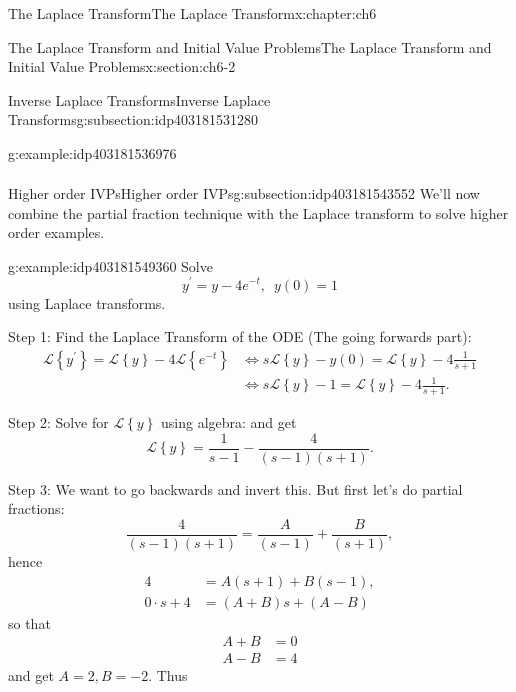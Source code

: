 \documentclass[oneside,10pt,]{book}
\numberwithin{equation}{section}
\numberwithin{equation}{section}
\newcommand{\amp}{&}
\begin{document}
\begin{chapterptx}{The Laplace Transform}{}{The Laplace Transform}{}{}{x:chapter:ch6}
\begin{sectionptx}{The Laplace Transform and Initial Value Problems}{}{The Laplace Transform and Initial Value Problems}{}{}{x:section:ch6-2}
\begin{subsectionptx}{Inverse Laplace Transforms}{}{Inverse Laplace Transforms}{}{}{g:subsection:idp403181531280}
\begin{example}{}{g:example:idp403181536976}
\begin{align*}
\end{align*}
%
\end{example}
\end{subsectionptx}
%
%
\typeout{************************************************}
\typeout{************************************************}
%
\begin{subsectionptx}{Higher order IVPs}{}{Higher order IVPs}{}{}{g:subsection:idp403181543552}
We'll now combine the partial fraction technique with the Laplace transform to solve higher order examples.%
\begin{example}{}{g:example:idp403181549360}%
Solve%
\begin{equation*}
y^{\prime}=y-4e^{-t},\,\,\,y(0)=1
\end{equation*}
using Laplace transforms.%
\par
Step 1: Find the Laplace Transform of the ODE (The going forwards part):%
\begin{align*}
\mathcal{L}\left\{ y^{\prime}\right\} =\mathcal{L}\left\{ y\right\} -4\mathcal{L}\left\{ e^{-t}\right\}  \amp \iff s\mathcal{L}\left\{ y\right\} -y(0)=\mathcal{L}\left\{ y\right\} -4\frac{1}{s+1}\\
\amp \iff s\mathcal{L}\left\{ y\right\} -1=\mathcal{L}\left\{ y\right\} -4\frac{1}{s+1}.
\end{align*}
%
\par
Step 2: Solve for \(\mathcal{L}\left\{ y\right\} \) using algebra: and get%
\begin{equation*}
\mathcal{L}\left\{ y\right\} =\frac{1}{s-1}-\frac{4}{\left(s-1\right)\left(s+1\right)}.
\end{equation*}
%
\par
Step 3: We want to go backwards and invert this. But first let's do partial fractions:%
\begin{equation*}
\frac{4}{\left(s-1\right)\left(s+1\right)}=\frac{A}{\left(s-1\right)}+\frac{B}{\left(s+1\right)},
\end{equation*}
hence%
\begin{align*}
4 \amp =A\left(s+1\right)+B\left(s-1\right),\\
0\cdot s+4 \amp =\left(A+B\right)s+\left(A-B\right)
\end{align*}
so that%
\begin{align*}
A+B \amp =0\\
A-B \amp =4
\end{align*}
and get \(A=2,B=-2\). Thus%
\begin{equation*}

\end{equation*}
\end{example}
\end{subsectionptx}
\end{sectionptx}
\end{chapterptx}
\end{document}
